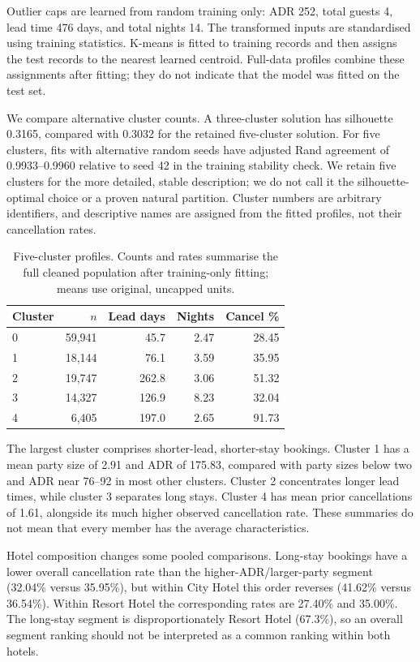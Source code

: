 Outlier caps are learned from random training only: ADR 252, total guests 4, lead time 476 days, and total nights 14. The transformed inputs are standardised using training statistics. K-means is fitted to training records and then assigns the test records to the nearest learned centroid. Full-data profiles combine these assignments after fitting; they do not indicate that the model was fitted on the test set.

We compare alternative cluster counts. A three-cluster solution has silhouette 0.3165, compared with 0.3032 for the retained five-cluster solution. For five clusters, fits with alternative random seeds have adjusted Rand agreement of 0.9933--0.9960 relative to seed 42 in the training stability check. We retain five clusters for the more detailed, stable description; we do not call it the silhouette-optimal choice or a proven natural partition. Cluster numbers are arbitrary identifiers, and descriptive names are assigned from the fitted profiles, not their cancellation rates.

\begin{table}[t]
\caption{Five-cluster profiles. Counts and rates summarise the full cleaned population after training-only fitting; means use original, uncapped units.}
\label{tab:clusters}
\centering
\begin{tabular}{lrrrr}
\toprule
Cluster & \(n\) & Lead days & Nights & Cancel \%\\
\midrule
0 & 59,941 & 45.7 & 2.47 & 28.45\\
1 & 18,144 & 76.1 & 3.59 & 35.95\\
2 & 19,747 & 262.8 & 3.06 & 51.32\\
3 & 14,327 & 126.9 & 8.23 & 32.04\\
4 & 6,405 & 197.0 & 2.65 & 91.73\\
\bottomrule
\end{tabular}
\end{table}

The largest cluster comprises shorter-lead, shorter-stay bookings. Cluster 1 has a mean party size of 2.91 and ADR of 175.83, compared with party sizes below two and ADR near 76--92 in most other clusters. Cluster 2 concentrates longer lead times, while cluster 3 separates long stays. Cluster 4 has mean prior cancellations of 1.61, alongside its much higher observed cancellation rate. These summaries do not mean that every member has the average characteristics.

Hotel composition changes some pooled comparisons. Long-stay bookings have a lower overall cancellation rate than the higher-ADR/larger-party segment (32.04\% versus 35.95\%), but within City Hotel this order reverses (41.62\% versus 36.54\%). Within Resort Hotel the corresponding rates are 27.40\% and 35.00\%. The long-stay segment is disproportionately Resort Hotel (67.3\%), so an overall segment ranking should not be interpreted as a common ranking within both hotels.

